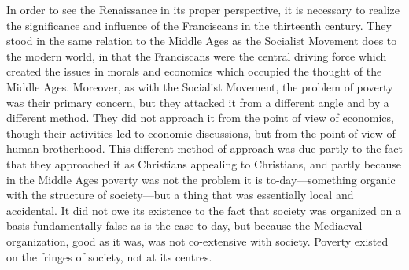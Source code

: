\documentclass{book}
\begin{document}
In order to see the Renaissance in its proper perspective, it is necessary to realize the significance and influence of the Franciscans in the thirteenth century. They stood in the same relation to the Middle Ages as the Socialist Movement does to the modern world, in that the Franciscans were the central driving force which created the issues in morals and economics which occupied the thought of the Middle Ages. Moreover, as with the Socialist Movement, the problem of poverty was their primary concern, but they attacked it from a different angle and by a different method. They did not approach it from the point of view of economics, though their activities led to economic discussions, but from the point of view of human brotherhood. This different method of approach was due partly to the fact that they approached it as Christians appealing to Christians, and partly because in the Middle Ages poverty was not the problem it is to-day—something organic with the structure of society—but a thing that was essentially local and accidental. It did not owe its existence to the fact that society was organized on a basis fundamentally false as is the case to-day, but because the Mediaeval organization, good as it was, was not co-extensive with society. Poverty existed on the fringes of society, not at its centres.
\end{document}
